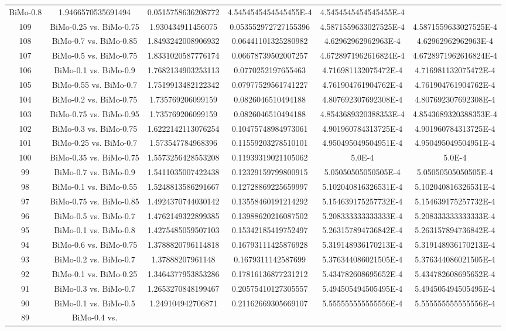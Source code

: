 \documentclass[a4paper,10pt]{article}
\begin{document}
\begin{landscape}
\begin{table}[!htp]
\begin{tabular}{cccccc}
BiMo-0.8&1.9466570535691494&0.0515758636208772&4.5454545454545455E-4&4.5454545454545455E-4\\109&BiMo-0.25 vs. BiMo-0.75&1.930434911456075&0.053552972727155396&4.5871559633027525E-4&4.5871559633027525E-4\\108&BiMo-0.7 vs. BiMo-0.85&1.8493242008906932&0.06441101325280982&4.62962962962963E-4&4.62962962962963E-4\\107&BiMo-0.5 vs. BiMo-0.75&1.8331020587776174&0.06678739502007257&4.6728971962616824E-4&4.6728971962616824E-4\\106&BiMo-0.1 vs. BiMo-0.9&1.7682134903253113&0.0770252197655463&4.716981132075472E-4&4.716981132075472E-4\\105&BiMo-0.55 vs. BiMo-0.7&1.7519913482122342&0.07977529561741227&4.761904761904762E-4&4.761904761904762E-4\\104&BiMo-0.2 vs. BiMo-0.75&1.735769206099159&0.0826046510494188&4.807692307692308E-4&4.807692307692308E-4\\103&BiMo-0.75 vs. BiMo-0.95&1.735769206099159&0.0826046510494188&4.8543689320388353E-4&4.8543689320388353E-4\\102&BiMo-0.3 vs. BiMo-0.75&1.6222142113076254&0.10475748984973061&4.901960784313725E-4&4.901960784313725E-4\\101&BiMo-0.25 vs. BiMo-0.7&1.573547784968396&0.11559203278510101&4.950495049504951E-4&4.950495049504951E-4\\100&BiMo-0.35 vs. BiMo-0.75&1.5573256428553208&0.11939319021105062&5.0E-4&5.0E-4\\99&BiMo-0.7 vs. BiMo-0.9&1.5411035007422438&0.12329159799800915&5.05050505050505E-4&5.05050505050505E-4\\98&BiMo-0.1 vs. BiMo-0.55&1.5248813586291667&0.12728869225659997&5.102040816326531E-4&5.102040816326531E-4\\97&BiMo-0.75 vs. BiMo-0.85&1.4924370744030142&0.13558460191214292&5.154639175257732E-4&5.154639175257732E-4\\96&BiMo-0.5 vs. BiMo-0.7&1.4762149322899385&0.13988620216087502&5.208333333333333E-4&5.208333333333333E-4\\95&BiMo-0.1 vs. BiMo-0.8&1.4275485059507103&0.15342185419752497&5.263157894736842E-4&5.263157894736842E-4\\94&BiMo-0.6 vs. BiMo-0.75&1.3788820796114818&0.16793111425876928&5.319148936170213E-4&5.319148936170213E-4\\93&BiMo-0.2 vs. BiMo-0.7&1.37888207961148&0.1679311142587699&5.376344086021505E-4&5.376344086021505E-4\\92&BiMo-0.1 vs. BiMo-0.25&1.3464377953853286&0.17816136877231212&5.434782608695652E-4&5.434782608695652E-4\\91&BiMo-0.3 vs. BiMo-0.7&1.2653270848199467&0.20575410127305557&5.494505494505495E-4&5.494505494505495E-4\\90&BiMo-0.1 vs. BiMo-0.5&1.249104942706871&0.21162669305669107&5.555555555555556E-4&5.555555555555556E-4\\89&BiMo-0.4 vs. 
\end{tabular}
\end{table}
\end{landscape}
\end{document}
